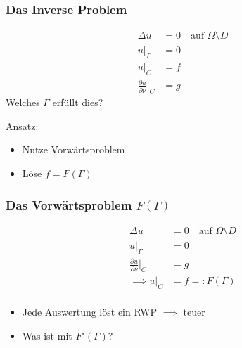 \documentclass{beamer}
\begin{document}
\begin{frame}
	\frametitle{Das Inverse Problem}
	\begin{minipage}{0.5\textwidth}
		\begin{align*}
			\Delta u &= 0 \quad \text{auf $\Omega \setminus D$} \\
			u|_\Gamma &= 0 \\
			u|_C &= f \\
			\tfrac{\partial u}{\partial \nu}|_C &= g
		\end{align*}
		\pause
		Welches $\Gamma$ erfüllt dies?
	\end{minipage}
	\begin{minipage}{0.48\textwidth}
		\pause
		Ansatz:
		\begin{itemize}
			\item
				Nutze Vorwärtsproblem
			\item \pause
				Löse $f = F(\Gamma)$
		\end{itemize}
	\end{minipage}
\end{frame}

\begin{frame}
	\frametitle{Das Vorwärtsproblem $F(\Gamma)$}
	\begin{minipage}{0.5\textwidth}
		\begin{align*}
			\Delta u &= 0 \quad \text{auf $\Omega \setminus D$} \\
			u|_\Gamma &= 0 \\
			\tfrac{\partial u}{\partial \nu}|_C &= g \\
			\implies u|_C &= f =: F(\Gamma) \\
		\end{align*}
	\end{minipage}
	\begin{minipage}{0.48\textwidth}
		\begin{itemize}
			\item \pause
				Jede Auswertung löst ein RWP $\implies$ teuer
			\item \pause
				Was ist mit $F'(\Gamma)$?
		\end{itemize}
	\end{minipage}
\end{frame}
\end{document}
